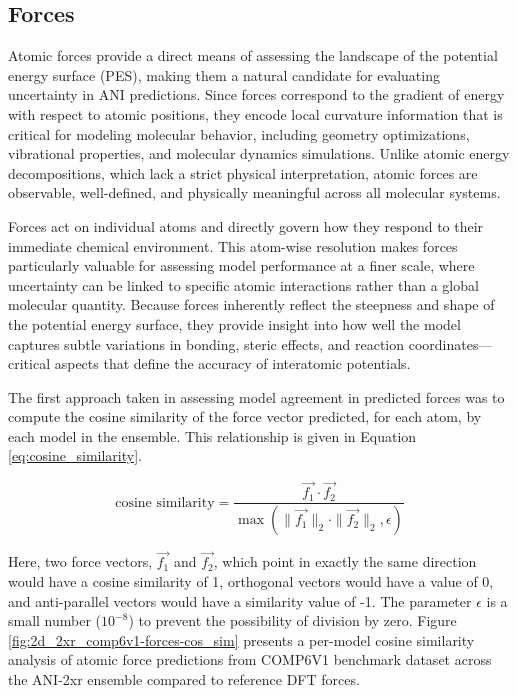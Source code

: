 \subsection{Forces}
\label{subsec:forces}

Atomic forces provide a direct means of assessing the landscape of the potential energy surface (PES), making them a natural candidate for evaluating uncertainty in ANI predictions. 
Since forces correspond to the gradient of energy with respect to atomic positions, they encode local curvature information that is critical for modeling molecular behavior, including geometry optimizations, vibrational properties, and molecular dynamics simulations. 
Unlike atomic energy decompositions, which lack a strict physical interpretation, atomic forces are observable, well-defined, and physically meaningful across all molecular systems.

Forces act on individual atoms and directly govern how they respond to their immediate chemical environment. This atom-wise resolution makes forces particularly valuable for assessing model performance at a finer scale, where uncertainty can be linked to specific atomic interactions rather than a global molecular quantity. 
Because forces inherently reflect the steepness and shape of the potential energy surface, they provide insight into how well the model captures subtle variations in bonding, steric effects, and reaction coordinates---critical aspects that define the accuracy of interatomic potentials.

The first approach taken in assessing model agreement in predicted forces was to compute the cosine similarity of the force vector predicted, for each atom, by each model in the ensemble. This relationship is given in Equation \ref{eq:cosine_similarity}.

\begin{equation}
\text{cosine similarity} = \frac{\vec{f_1} \cdot \vec{f_2}}{\max(\|\vec{f_1}\|_2 \cdot \|\vec{f_2}\|_2, \epsilon)}
\label{eq:cosine_similarity}
\end{equation}

Here, two force vectors, $\vec{f_1}$ and $\vec{f_2}$, which point in exactly the same direction would have a cosine similarity of 1, orthogonal vectors would have a value of 0, and anti-parallel vectors would have a similarity value of -1.
The parameter $\epsilon$ is a small number ($10^{-8}$) to prevent the possibility of division by zero. 
Figure \ref{fig:2d_2xr_comp6v1-forces-cos_sim} presents a per-model cosine similarity analysis of atomic force predictions from COMP6V1 benchmark dataset across the ANI-2xr ensemble compared to reference DFT forces. 

